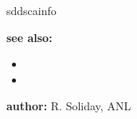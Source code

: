 \begin{sddsprog}{sddscainfo}
\item \textbf{see also:}
  \begin{itemize}
  \item {}
  \item {}
  \end{itemize}

\item \textbf{author:} R. Soliday, ANL
\end{sddsprog}
